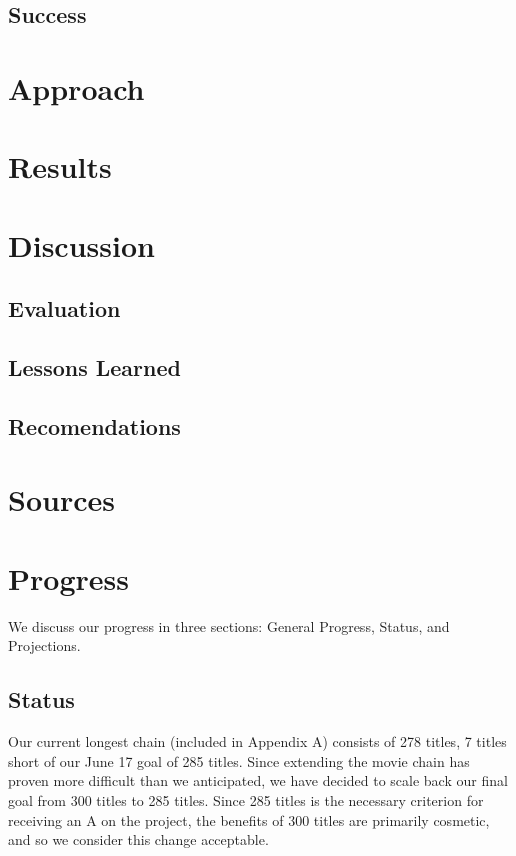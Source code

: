 \documentclass[11pt,english]{article}
\begin{document}
\subsection{Success}

\section{Approach}

\section{Results}

\section{Discussion}
\subsection{Evaluation}
\subsection{Lessons Learned}
\subsection{Recomendations}

\section{Sources}

\section{Progress}
We discuss our progress in three sections: General Progress, Status, and
Projections.

\subsection{Status}
Our current longest chain (included in Appendix A) consists of 278 titles,
7 titles short of our June 17 goal of 285 titles. Since extending the movie chain has
proven more difficult than we anticipated, we have decided to scale back our
final goal from 300 titles to 285 titles. Since 285 titles is the necessary
criterion for receiving an A on the project, the benefits of 300 titles are
primarily cosmetic, and so we consider this change acceptable.
\end{document}

